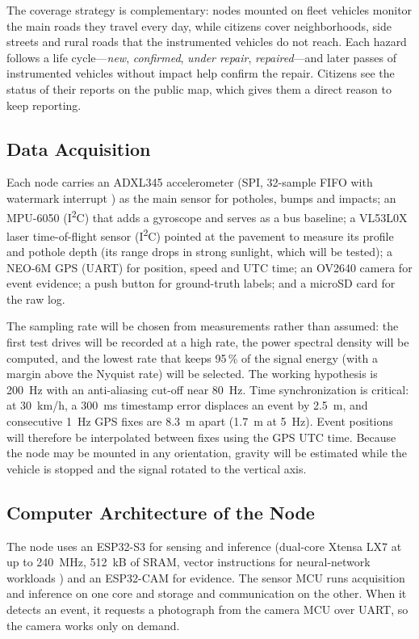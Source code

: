 \documentclass[journal,10pt]{IEEEtran}
\begin{document}
The coverage strategy is complementary: nodes mounted on fleet vehicles monitor the main roads they travel every day, while citizens cover neighborhoods, side streets and rural roads that the instrumented vehicles do not reach. Each hazard follows a life cycle---\textit{new}, \textit{confirmed}, \textit{under repair}, \textit{repaired}---and later passes of instrumented vehicles without impact help confirm the repair. Citizens see the status of their reports on the public map, which gives them a direct reason to keep reporting.

\subsection{Data Acquisition}
Each node carries an ADXL345 accelerometer (SPI, 32-sample FIFO with watermark interrupt \cite{adi_adxl345}) as the main sensor for potholes, bumps and impacts; an MPU-6050 (I\textsuperscript{2}C) that adds a gyroscope and serves as a bus baseline; a VL53L0X laser time-of-flight sensor (I\textsuperscript{2}C) pointed at the pavement to measure its profile and pothole depth (its range drops in strong sunlight, which will be tested); a NEO-6M GPS (UART) for position, speed and UTC time; an OV2640 camera for event evidence; a push button for ground-truth labels; and a microSD card for the raw log.



The sampling rate will be chosen from measurements rather than assumed: the first test drives will be recorded at a high rate, the power spectral density will be computed, and the lowest rate that keeps 95\,\% of the signal energy (with a margin above the Nyquist rate) will be selected. The working hypothesis is 200~Hz with an anti-aliasing cut-off near 80~Hz. Time synchronization is critical: at 30~km/h, a 300~ms timestamp error displaces an event by 2.5~m, and consecutive 1~Hz GPS fixes are 8.3~m apart (1.7~m at 5~Hz). Event positions will therefore be interpolated between fixes using the GPS UTC time. Because the node may be mounted in any orientation, gravity will be estimated while the vehicle is stopped and the signal rotated to the vertical axis.

\subsection{Computer Architecture of the Node}
The node uses an ESP32-S3 for sensing and inference (dual-core Xtensa LX7 at up to 240~MHz, 512~kB of SRAM, vector instructions for neural-network workloads \cite{espressif_s3}) and an ESP32-CAM for evidence. The sensor MCU runs acquisition and inference on one core and storage and communication on the other. When it detects an event, it requests a photograph from the camera MCU over UART, so the camera works only on demand.
\end{document}
